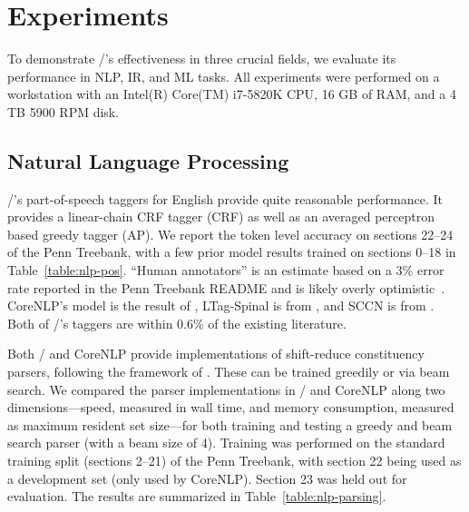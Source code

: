 \section{Experiments}
\label{sec:experiments}

To demonstrate \meta/'s effectiveness in three crucial fields, we evaluate its
performance in NLP, IR, and ML tasks. All experiments were performed on a
workstation with an Intel(R) Core(TM) i7-5820K CPU, 16 GB of RAM, and a 4
TB 5900 RPM disk.













\subsection{Natural Language Processing}


\meta/'s part-of-speech taggers for English provide quite reasonable
performance. It provides a linear-chain CRF tagger (CRF) as well as an
averaged perceptron based greedy tagger (AP). We report the token level
accuracy on sections 22--24 of the Penn Treebank, with a few prior model
results trained on sections 0--18 in Table~\ref{table:nlp-pos}. ``Human
annotators'' is an estimate based on a 3\% error rate reported in the Penn
Treebank README and is likely overly
optimistic~\citep{Manning:2011:CICLing}. CoreNLP's model is the result of
\citet{Manning:2011:CICLing}, LTag-Spinal is from
\citet{Shen:2007:ACL}, and SCCN is from \citet{Sogaard:2011:ACL-HLT}.
Both of \meta/'s taggers are within $0.6\%$ of the existing literature.

Both \meta/ and CoreNLP provide implementations of shift-reduce
constituency parsers, following the framework of \citet{const-parsing}.
These can be trained greedily or via beam search. We compared the parser
implementations in \meta/ and CoreNLP along two dimensions---speed,
measured in wall time, and memory consumption, measured as maximum resident
set size---for both training and testing a greedy and beam search parser
(with a beam size of 4). Training was performed on the standard training
split (sections 2--21) of the Penn Treebank, with section 22 being used as
a development set (only used by CoreNLP). Section 23 was held out for
evaluation. The results are summarized in Table~\ref{table:nlp-parsing}.

